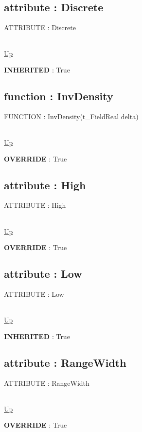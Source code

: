 \subsection*{attribute : Discrete}
\hypertarget{ecldoc:linearregression.ols.distributionbase.discrete}{ATTRIBUTE : Discrete} \\
\hyperlink{ecldoc:linearregression.ols.tdistribution}{Up} \\
\par
\textbf{INHERITED} : True \\
\subsection*{function : InvDensity}
\hypertarget{ecldoc:linearregression.ols.tdistribution.invdensity}{FUNCTION : InvDensity(t\_FieldReal delta)} \\
\hyperlink{ecldoc:linearregression.ols.tdistribution}{Up} \\
\par
\textbf{OVERRIDE} : True \\
\subsection*{attribute : High}
\hypertarget{ecldoc:linearregression.ols.tdistribution.high}{ATTRIBUTE : High} \\
\hyperlink{ecldoc:linearregression.ols.tdistribution}{Up} \\
\par
\textbf{OVERRIDE} : True \\
\subsection*{attribute : Low}
\hypertarget{ecldoc:linearregression.ols.tdistribution.low}{ATTRIBUTE : Low} \\
\hyperlink{ecldoc:linearregression.ols.tdistribution}{Up} \\
\par
\textbf{INHERITED} : True \\
\subsection*{attribute : RangeWidth}
\hypertarget{ecldoc:linearregression.ols.tdistribution.rangewidth}{ATTRIBUTE : RangeWidth} \\
\hyperlink{ecldoc:linearregression.ols.tdistribution}{Up} \\
\par
\textbf{OVERRIDE} : True \\

